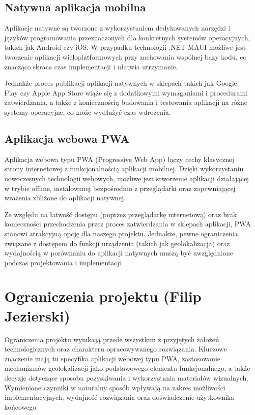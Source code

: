 \subsection{Natywna aplikacja mobilna}
Aplikacje natywne są tworzone z wykorzystaniem dedykowanych narzędzi i języków programowania przeznaczonych dla konkretnych systemów operacyjnych, takich jak Android czy iOS. W przypadku technologii .NET MAUI możliwe jest tworzenie aplikacji wieloplatformowych przy zachowaniu wspólnej bazy kodu, co znacząco skraca czas implementacji i ułatwia utrzymanie.

Jednakże proces publikacji aplikacji natywnych w sklepach takich jak Google Play czy Apple App Store wiąże się z dodatkowymi wymaganiami i procedurami zatwierdzania, a także z koniecznością budowania i testowania aplikacji na różne systemy operacyjne, co może wydłużyć czas wdrożenia.

\subsection{Aplikacja webowa PWA}
Aplikacja webowa typu PWA (Progressive Web App) łączy cechy klasycznej strony internetowej z funkcjonalnością aplikacji mobilnej. Dzięki wykorzystaniu nowoczesnych technologii webowych, możliwe jest stworzenie aplikacji działającej w trybie offline, instalowanej bezpośrednio z przeglądarki oraz zapewniającej wrażenia zbliżone do aplikacji natywnej.

Ze względu na łatwość dostępu (poprzez przeglądarkę internetową) oraz brak konieczności przechodzenia przez proces zatwierdzania w sklepach aplikacji, PWA stanowi atrakcyjną opcję dla naszego projektu. Jednakże, pewne ograniczenia związane z dostępem do funkcji urządzenia (takich jak geolokalizacja) oraz wydajnością w porównaniu do aplikacji natywnych muszą być uwzględnione podczas projektowania i implementacji.

\section{Ograniczenia projektu (Filip Jezierski)}
Ograniczenia projektu wynikają przede wszystkim z przyjętych założeń technologicznych oraz charakteru opracowywanego rozwiązania. Kluczowe znaczenie mają tu specyfika aplikacji webowej typu PWA, zastosowanie mechanizmów geolokalizacji jako podstawowego elementu funkcjonalnego, a także decyzje dotyczące sposobu pozyskiwania i wykorzystania materiałów wizualnych. Wymienione czynniki w naturalny sposób wpływają na zakres możliwości implementacyjnych, wydajność rozwiązania oraz doświadczenie użytkownika końcowego.

